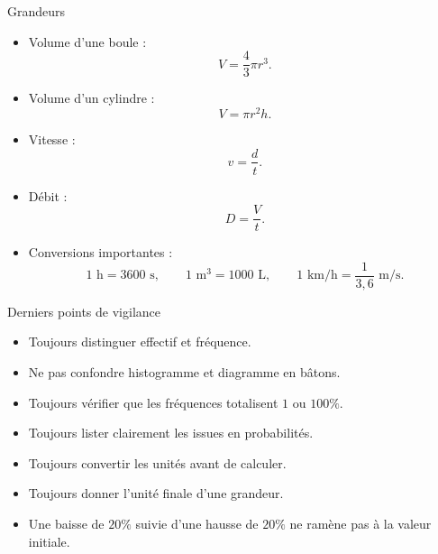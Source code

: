 \documentclass[11pt,a4paper]{article}
\begin{document}
\begin{retenirbox}{Grandeurs}
\begin{itemize}
    \item Volume d'une boule :
    \[
    V=\frac{4}{3}\pi r^3.
    \]
    \item Volume d'un cylindre :
    \[
    V=\pi r^2h.
    \]
    \item Vitesse :
    \[
    v=\frac{d}{t}.
    \]
    \item Débit :
    \[
    D=\frac{V}{t}.
    \]
    \item Conversions importantes :
    \[
    1\text{ h}=3600\text{ s},
    \qquad
    1\text{ m}^3=1000\text{ L},
    \qquad
    1\text{ km/h}=\frac{1}{3{,}6}\text{ m/s}.
    \]
\end{itemize}
\end{retenirbox}

\begin{warningbox}{Derniers points de vigilance}
\begin{itemize}
    \item Toujours distinguer effectif et fréquence.
    \item Ne pas confondre histogramme et diagramme en bâtons.
    \item Toujours vérifier que les fréquences totalisent $1$ ou $100\%$.
    \item Toujours lister clairement les issues en probabilités.
    \item Toujours convertir les unités avant de calculer.
    \item Toujours donner l'unité finale d'une grandeur.
    \item Une baisse de $20\%$ suivie d'une hausse de $20\%$ ne ramène pas à la valeur initiale.
\end{itemize}
\end{warningbox}
\end{document}
